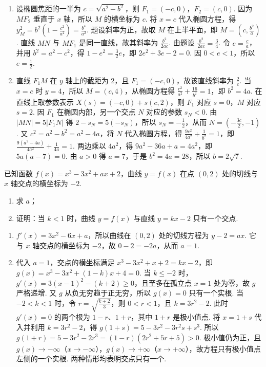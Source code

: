 \begin{solution}
\begin{enumerate}
\item 设椭圆焦距的一半为 \(c=\sqrt{a^2-b^2}\)，则 \(F_1=(-c,0)\)，\(F_2=(c,0)\). 因为 \(MF_2\) 垂直于 \(x\) 轴，所以 \(M\) 的横坐标为 \(c\). 将 \(x=c\) 代入椭圆方程，得 \(y_M^2=b^2(1-\frac{c^2}{a^2})=\frac{b^4}{a^2}\). 题设斜率为正，故取 \(M\) 在上半平面，即 \(M=(c,\frac{b^2}{a})\). 直线 \(MN\) 与 \(MF_1\) 是同一直线，故其斜率为 \(\frac{b^2}{2ac}\). 由题设
\(\frac{b^2}{2ac}=\frac34\). 令 \(e=\frac ca\)，并用 \(b^2=a^2-c^2\)，得 \(1-e^2=\frac32e\)，即 \(2e^2+3e-2=0\). 因 \(0<e<1\)，所以 \(e=\frac12\).
\item 直线 \(F_1M\) 在 \(y\) 轴上的截距为 \(2\)，且 \(F_1=(-c,0)\)，故该直线斜率为 \(\frac2c\). 当 \(x=c\) 时 \(y=4\)，所以 \(M=(c,4)\)，从椭圆方程得 \(\frac{c^2}{a^2}+\frac{16}{b^2}=1\)，即 \(b^2=4a\). 在直线上取参数表示 \(X(s)=(-c,0)+s(c,2)\)，则 \(F_1\) 对应 \(s=0\)，\(M\) 对应 \(s=2\). 因 \(F_1\) 在椭圆内部，另一个交点 \(N\) 对应的参数 \(s_N<0\). 由 \(|MN|=5|F_1N|\) 得 \(2-s_N=5(-s_N)\)，所以 \(s_N=-\frac12\)，从而 \(N=(-\frac{3c}{2},-1)\).
又 \(c^2=a^2-b^2=a^2-4a\)，将 \(N\) 代入椭圆方程，得
\(\frac{9c^2}{4a^2}+\frac{1}{b^2}=1\)，即 \(\frac{9(a^2-4a)}{4a^2}+\frac{1}{4a}=1\). 两边乘以 \(4a^2\)，得 \(9a^2-36a+a=4a^2\)，即 \(5a(a-7)=0\). 由 \(a>0\) 得 \(a=7\)，于是 \(b^2=4a=28\)，所以 \(b=2\sqrt7\).
\end{enumerate}
\end{solution}

\begin{problem}
已知函数 \(f(x)=x^3-3x^2+ax+2\)，曲线 \(y=f(x)\) 在点 \((0,2)\) 处的切线与 \(x\) 轴交点的横坐标为 \(-2\).
\begin{enumerate}
\item 求 \(a\)；
\item 证明：当 \(k<1\) 时，曲线 \(y=f(x)\) 与直线 \(y=kx-2\) 只有一个交点.
\end{enumerate}
\end{problem}

\begin{solution}
\begin{enumerate}
\item \(f'(x)=3x^2-6x+a\)，所以曲线在 \((0,2)\) 处的切线方程为 \(y-2=ax\). 它与 \(x\) 轴交点的横坐标为 \(-2\)，故 \(0-2=-2a\)，从而 \(a=1\).
\item 代入 \(a=1\)，交点的横坐标满足
\(x^3-3x^2+x+2=kx-2\)，即 \(g(x)=x^3-3x^2+(1-k)x+4=0\).
当 \(k\leqslant-2\) 时，\(g'(x)=3(x-1)^2-(k+2)\geqslant0\)，且至多在孤立点 \(x=1\) 处为零，故 \(g\) 严格递增. 又 \(g\) 从负无穷趋于正无穷，所以 \(g(x)=0\) 只有一个实根.
当 \(-2<k<1\) 时，令 \(r=\sqrt{\frac{k+2}{3}}\)，则 \(0<r<1\)，且 \(k=3r^2-2\). 此时 \(g'(x)=0\) 的两个根为 \(1-r\)、\(1+r\)，其中 \(1+r\) 是极小值点. 将 \(x=1+s\) 代入并利用 \(k=3r^2-2\)，得 \(g(1+s)=5-3r^2-3r^2s+s^3\). 所以
\(g(1+r)=5-3r^2-2r^3=(1-r)(2r^2+5r+5)>0\).
极小值仍为正，且 \(g(x)\to-\infty\)（\(x\to-\infty\)），\(g(x)\to+\infty\)（\(x\to+\infty\)），故方程只有极小值点左侧的一个实根. 两种情形均表明交点只有一个.
\end{enumerate}
\end{solution}

